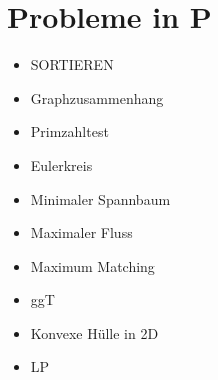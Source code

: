 \documentclass[a4paper,graphics,11pt]{article}
\begin{document}
\newpage

\section*{Probleme in \textsf{P}}

\begin{itemize}
    \item SORTIEREN
    \item Graphzusammenhang
    \item Primzahltest
    \item Eulerkreis
    \item Minimaler Spannbaum
    \item Maximaler Fluss
    \item Maximum Matching
    \item ggT
    \item Konvexe Hülle in 2D
    \item LP
\end{itemize}
\end{document}
